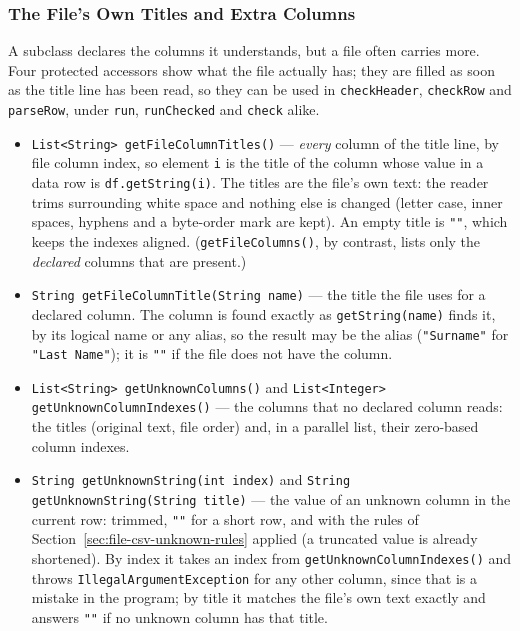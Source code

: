 \subsubsection*{The File's Own Titles and Extra Columns}
\label{sec:file-csv-titles}

A subclass declares the columns it understands, but a file often carries more.  Four protected accessors show what the file actually has; they are filled as soon as the title line has been read, so they can be used in \texttt{checkHeader}, \texttt{checkRow} and \texttt{parseRow}, under \texttt{run}, \texttt{runChecked} and \texttt{check} alike.

\begin{itemize}
\item \texttt{List<String> getFileColumnTitles()} --- \emph{every} column of the title line, by file column index, so element \texttt{i} is the title of the column whose value in a data row is \texttt{df.getString(i)}.  The titles are the file's own text: the reader trims surrounding white space and nothing else is changed (letter case, inner spaces, hyphens and a byte-order mark are kept).  An empty title is \texttt{""}, which keeps the indexes aligned.  (\texttt{getFileColumns()}, by contrast, lists only the \emph{declared} columns that are present.)
\item \texttt{String getFileColumnTitle(String name)} --- the title the file uses for a declared column.  The column is found exactly as \texttt{getString(name)} finds it, by its logical name or any alias, so the result may be the alias (\texttt{"Surname"} for \texttt{"Last Name"}); it is \texttt{""} if the file does not have the column.
\item \texttt{List<String> getUnknownColumns()} and \texttt{List<Integer> getUnknownColumnIndexes()} --- the columns that no declared column reads: the titles (original text, file order) and, in a parallel list, their zero-based column indexes.
\item \texttt{String getUnknownString(int index)} and \texttt{String getUnknownString(String title)} --- the value of an unknown column in the current row: trimmed, \texttt{""} for a short row, and with the rules of Section~\ref{sec:file-csv-unknown-rules} applied (a truncated value is already shortened).  By index it takes an index from \texttt{getUnknownColumnIndexes()} and throws \texttt{IllegalArgumentException} for any other column, since that is a mistake in the program; by title it matches the file's own text exactly and answers \texttt{""} if no unknown column has that title.
\end{itemize}

